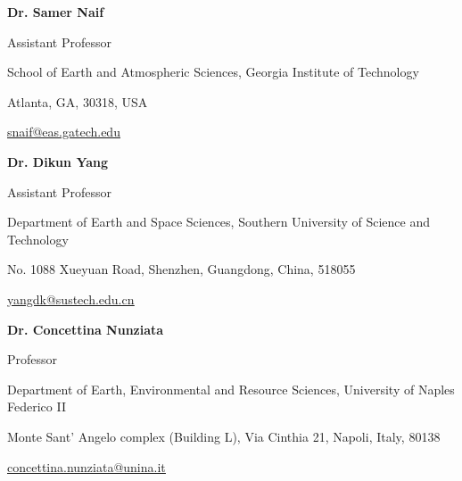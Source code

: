 

\begin{cvparagraph}

    \fontsize{11pt}{1.3em}\selectfont
    \textbf{Dr. Samer Naif} 

    Assistant Professor

    School of Earth and Atmospheric Sciences, Georgia Institute of Technology

    Atlanta, GA, 30318, USA

    \href{mailto:snaif@eas.gatech.edu}
    {\underline{snaif@eas.gatech.edu}}

    \vspace{12pt}

    \textbf{Dr. Dikun Yang} 

    Assistant Professor

    Department of Earth and Space Sciences, Southern University of Science and Technology
    
    No. 1088 Xueyuan Road, Shenzhen, Guangdong, China, 518055


    \href{mailto:yangdk@sustech.edu.cn}
    {\underline{yangdk@sustech.edu.cn}}

    \vspace{12pt}

    \textbf{Dr. Concettina Nunziata} 

    Professor

    Department of Earth, Environmental and Resource Sciences, University of Naples Federico II

    Monte Sant' Angelo complex (Building L), Via Cinthia 21, Napoli, Italy, 80138


    \href{mailto:concettina.nunziata@unina.it}
    {\underline{concettina.nunziata@unina.it}}

\end{cvparagraph}
